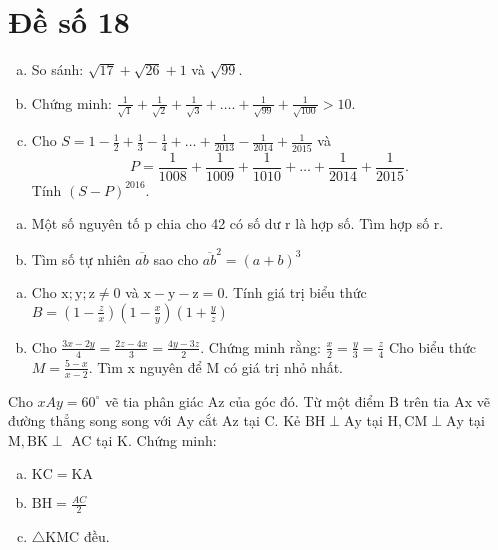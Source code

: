 \onehalfspacing
\section{Đề số 18}

\begin{bt} 
    \hfil
    \begin{enumerate}[a.]
        \item So sánh: $\sqrt{17}+\sqrt{26}+1$ và $\sqrt{99}$.
        \item Chứng minh: $\frac{1}{\sqrt{1}}+\frac{1}{\sqrt{2}}+\frac{1}{\sqrt{3}}+\ldots .+\frac{1}{\sqrt{99}}+\frac{1}{\sqrt{100}}>10$.
        \item Cho $S=1-\frac{1}{2}+\frac{1}{3}-\frac{1}{4}+\ldots+\frac{1}{2013}-\frac{1}{2014}+\frac{1}{2015}$ và
        $$
        P=\frac{1}{1008}+\frac{1}{1009}+\frac{1}{1010}+\ldots+\frac{1}{2014}+\frac{1}{2015} \text {. }
        $$
        Tính $(S-P)^{2016}$.
    \end{enumerate}
\loigiai{}
\end{bt}

\begin{bt}
    \hfill
	\begin{enumerate}[a.]
        \item Một số nguyên tố $\mathrm{p}$ chia cho 42 có số dư $\mathrm{r}$ là hợp số. Tìm hợp số $\mathrm{r}$.
        \item Tìm số tự nhiên $\overline{a b}$ sao cho $\overline{a b}^2=(a+b)^3$
    \end{enumerate}
	\loigiai{} 
\end{bt}

\begin{bt}
    \hfill
	\begin{enumerate}[a.]
        \item Cho $\mathrm{x} ; \mathrm{y} ; \mathrm{z} \neq 0$ và $\mathrm{x}-\mathrm{y}-\mathrm{z}=0$. Tính giá trị biểu thức $B=\left(1-\frac{z}{x}\right)\left(1-\frac{x}{y}\right)\left(1+\frac{y}{z}\right)$
        \item Cho $\frac{3 x-2 y}{4}=\frac{2 z-4 x}{3}=\frac{4 y-3 z}{2}$. Chứng minh rằng: $\frac{x}{2}=\frac{y}{3}=\frac{z}{4}$
         Cho biểu thức $M=\frac{5-x}{x-2}$. Tìm x nguyên để $\mathrm{M}$ có giá trị nhỏ nhất.
    \end{enumerate}
	\loigiai{}
\end{bt}

\begin{bt}
   Cho $x A y=60^{\circ}$ vẽ tia phân giác $\mathrm{Az}$ của góc đó. Từ một điểm $\mathrm{B}$ trên tia $\mathrm{Ax}$ vẽ đường thẳng song song với $\mathrm{Ay}$ cắt $\mathrm{Az}$ tại $\mathrm{C}$. Kẻ $\mathrm{BH} \perp \mathrm{Ay}$ tại $\mathrm{H}, \mathrm{CM} \perp \mathrm{Ay}$ tại $\mathrm{M}, \mathrm{BK} \perp$ AC tại K. Chứng minh:
    \begin{enumerate}[a.]
        \item $\mathrm{KC}=\mathrm{KA}$
        \item $\mathrm{BH}=\frac{A C}{2}$
        \item $\triangle \mathrm{KMC}$ đều.
    \end{enumerate}
\loigiai{}
\end{bt}

